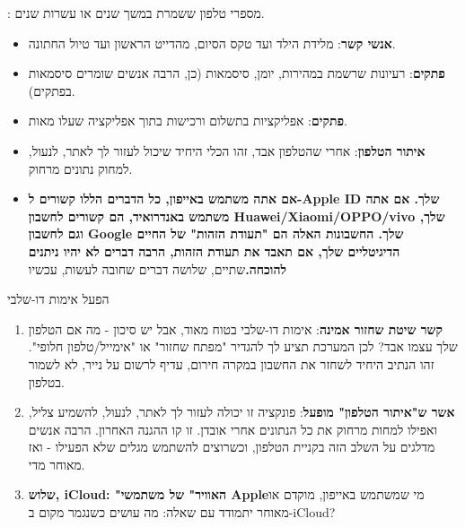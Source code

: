 


: מספרי טלפון ששמרת במשך שנים או עשרות שנים.

\begin{itemize}
  \item \textbf{אנשי קשר}: מלידת הילד ועד טקס הסיום, מהדייט הראשון ועד טיול החתונה.
  \item \textbf{פתקים}: רעיונות שרשמת במהירות, יומן, סיסמאות (כן, הרבה אנשים שומרים סיסמאות בפתקים).
  \item \textbf{פתקים}: אפליקציות בתשלום ורכישות בתוך אפליקציה שעלו מאות.
  \item \textbf{איתור הטלפון}: אחרי שהטלפון אבד, זהו הכלי היחיד שיכול לעזור לך לאתר, לנעול, למחוק נתונים מרחוק.
  \item \textbf{אם אתה משתמש באייפון, כל הדברים הללו קשורים ל-Apple ID שלך. אם אתה משתמש באנדרואיד, הם קשורים לחשבון Huawei/Xiaomi/OPPO/vivo שלך, וגם לחשבון Google שלך. החשבונות האלה הם "תעודת הזהות" של החיים הדיגיטליים שלך, אם תאבד את תעודת הזהות, הרבה דברים לא יהיו ניתנים להוכחה.}שתיים, שלושה דברים שחובה לעשות, עכשיו
\end{itemize}

הפעל אימות דו-שלבי


\begin{enumerate}
  \item \textbf{קשר שיטת שחזור אמינה}: אימות דו-שלבי בטוח מאוד, אבל יש סיכון - מה אם הטלפון שלך עצמו אבד? לכן המערכת תציע לך להגדיר "מפתח שחזור" או "אימייל/טלפון חלופי". זהו הנתיב היחיד לשחזר את החשבון במקרה חירום, עדיף לרשום על נייר, לא לשמור בטלפון.
  \item \textbf{אשר ש"איתור הטלפון" מופעל}: פונקציה זו יכולה לעזור לך לאתר, לנעול, להשמיע צליל, ואפילו למחות מרחוק את כל הנתונים אחרי אובדן. זו קו ההגנה האחרון. הרבה אנשים מדלגים על השלב הזה בקניית הטלפון, וכשרוצים להשתמש מגלים שלא הפעילו - ואז מאוחר מדי.
  \item \textbf{שלוש, iCloud: "האוויר" של משתמשי Apple}מי שמשתמש באייפון, מוקדם או מאוחר יתמודד עם שאלה: מה עושים כשנגמר מקום ב-iCloud?
\end{enumerate}

